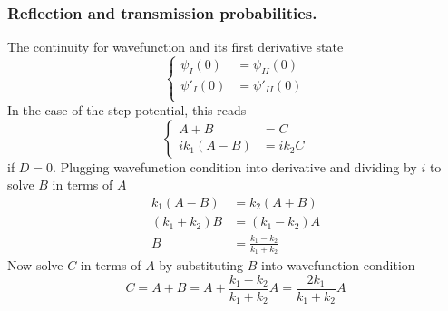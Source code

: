 \documentclass[../../../main.tex]{subfiles}
\begin{document}
\subsubsection{Reflection and transmission probabilities.}
The continuity for wavefunction and its first derivative state
\begin{equation*}
    \begin{cases}
        \psi_I(0)  & =\psi_{II}(0)  \\
        \psi'_I(0) & =\psi'_{II}(0) \\
    \end{cases}
\end{equation*}
In the case of the step potential, this reads
\begin{equation*}
    \begin{cases}
        A+B       & =C       \\
        ik_1(A-B) & =  ik_2C
    \end{cases}
\end{equation*}
if $D=0$.
Plugging wavefunction condition into derivative and dividing by $i$ to solve $B$ in  terms of $A$
\begin{align*}
    k_1(A-B)      & =  k_2(A+B)                 \\
    (k_1 + k_2) B & =  (k_1 - k_2) A            \\
    B             & =  \frac{k_1-k_2 }{k_1+k_2}
\end{align*}
Now solve $C$ in terms of $A$ by substituting $B$ into wavefunction condition
\begin{equation*}
    C = A + B = A + \frac{k_1 - k_2}{k_1 + k_2} A = \frac{2 k_1}{k_1 + k_2} A
\end{equation*}
\end{document}
